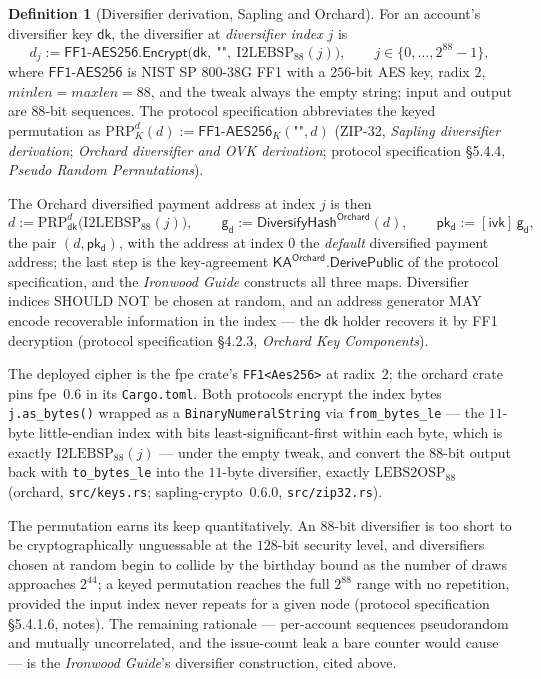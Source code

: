 \documentclass[11pt,a4paper]{article}
\theoremstyle{definition}
\newtheorem{definition}[theorem]{Definition}
\newcommand{\ivk}{\ensuremath{\mathsf{ivk}}}
\newcommand{\dk}{\ensuremath{\mathsf{dk}}}
\newcommand{\pkd}{\ensuremath{\mathsf{pk_d}}}
\newcommand{\gd}{\ensuremath{\mathsf{g_d}}}
\begin{document}
\begin{definition}[Diversifier derivation, Sapling and Orchard]\label{def:diversifier-derivation}
For an account's diversifier key $\dk$, the diversifier at
\emph{diversifier index} $j$ is
\[
d_j := \mathsf{FF1\text{-}AES256.Encrypt}\bigl(\dk,\ \texttt{""},\
\mathrm{I2LEBSP}_{88}(j)\bigr),
\qquad j \in \{0, \dots, 2^{88}-1\},
\]
where $\mathsf{FF1\text{-}AES256}$ is NIST SP 800-38G FF1 with a $256$-bit
AES key, radix $2$, $\mathit{minlen} = \mathit{maxlen} = 88$, and the tweak
always the empty string; input and output are $88$-bit sequences. The
protocol specification abbreviates the keyed permutation as
$\mathrm{PRP}^{d}_{K}(d) := \mathsf{FF1\text{-}AES256}_K(\texttt{""}, d)$
(ZIP-32, \emph{Sapling diversifier derivation}; \emph{Orchard diversifier
and OVK derivation}; protocol specification \S5.4.4, \emph{Pseudo Random
Permutations}).
\end{definition}

The Orchard diversified payment address at index $j$ is then
\[
d := \mathrm{PRP}^{d}_{\dk}\bigl(\mathrm{I2LEBSP}_{88}(j)\bigr),
\qquad
\gd := \mathsf{DiversifyHash}^{\mathsf{Orchard}}(d),
\qquad
\pkd := [\ivk]\,\gd,
\]
the pair $(d, \pkd)$, with the address at index $0$ the \emph{default}
diversified payment address; the last step is the key-agreement
$\mathsf{KA^{Orchard}.DerivePublic}$ of the protocol specification, and the
\emph{Ironwood Guide} constructs all three maps. Diversifier indices SHOULD
NOT be chosen at random, and an address generator MAY encode recoverable
information in the index --- the $\dk$ holder recovers it by FF1 decryption
(protocol specification \S4.2.3, \emph{Orchard Key Components}).

The deployed cipher is the \textsf{fpe} crate's \texttt{FF1<Aes256>} at
radix~$2$; the \textsf{orchard} crate pins \textsf{fpe}~0.6 in its
\texttt{Cargo.toml}. Both
protocols encrypt the index bytes \texttt{j.as\_bytes()} wrapped as a
\texttt{BinaryNumeralString} via \texttt{from\_bytes\_le} --- the $11$-byte
little-endian index with bits least-significant-first within each byte,
which is exactly $\mathrm{I2LEBSP}_{88}(j)$ --- under the empty tweak, and
convert the $88$-bit output back with \texttt{to\_bytes\_le}
into the $11$-byte diversifier, exactly $\mathrm{LEBS2OSP}_{88}$
(\textsf{orchard}, \texttt{src/keys.rs}; \textsf{sapling-crypto}~0.6.0,
\texttt{src/zip32.rs}).

The permutation earns its keep quantitatively. An $88$-bit diversifier is
too short to be cryptographically unguessable at the $128$-bit security
level, and diversifiers chosen at random begin to collide by the birthday
bound as the number of draws approaches $2^{44}$; a keyed permutation
reaches the full $2^{88}$ range with no repetition, provided the input
index never repeats for a given node (protocol specification \S5.4.1.6,
notes). The remaining rationale --- per-account sequences pseudorandom and
mutually uncorrelated, and the issue-count leak a bare counter would cause
--- is the \emph{Ironwood Guide}'s diversifier construction, cited above.
\end{document}
